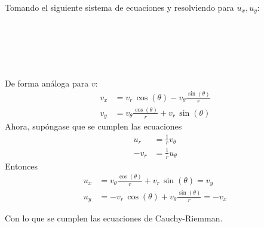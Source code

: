 \documentclass[leqno, 12pt]{article}
\begin{document}
Tomando el siguiente sistema de ecuaciones y resolviendo para $u_x,u_y$:
\begin{longderivation}
    \\
  \equiv\\
    \\
  \equiv\\
\end{longderivation}

De forma análoga para $v$:
\begin{align*}
  v_x &= v_r\,\cos(\theta) - v_\theta\frac{\sin(\theta)}{r}\\
  v_y &= v_\theta\frac{\cos(\theta)}{r} + v_r\,\sin(\theta)
\end{align*}
Ahora, supóngase que se cumplen las ecuaciones
\begin{align*}
  u_r &= \frac{1}{r}v_\theta\\[10pt]
-v_r &= \frac{1}{r}u_\theta
\end{align*}
Entonces
\begin{align*}
  u_x &= v_\theta\frac{\cos(\theta)}{r} + v_r\,\sin(\theta) = v_y\\
  u_y &= -v_r\,\cos(\theta) + v_\theta\frac{\sin(\theta)}{r} = -v_x
\end{align*}

Con lo que se cumplen las ecuaciones de Cauchy-Riemman.
\end{document}
